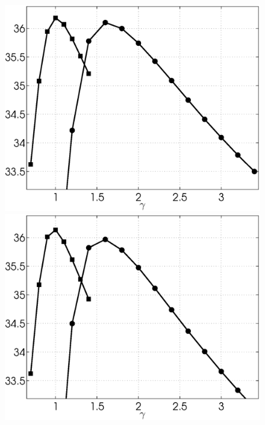 \documentclass{ipol}
\begin{document}
\begin{figure}[ht!]
	\includegraphics[width=.33\textwidth]{f/nldct/STH1bay-vs-HTH1lin_bpsnr_np2-g-curves_1np040_s10_average.eps}%
	\includegraphics[width=.33\textwidth]{f/nldct/STH1bay-vs-HTH1lin_bpsnr_np2-g-curves_1np100_s10_average.eps}\\
                                                                   

\end{figure}
\end{document}
